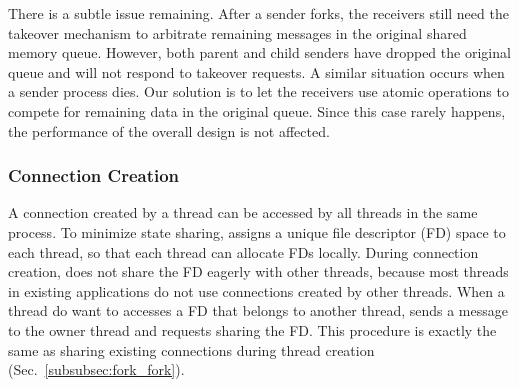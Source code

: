 There is a subtle issue remaining. After a sender forks, the receivers still need the takeover mechanism to arbitrate remaining messages in the original shared memory queue. However, both parent and child senders have dropped the original queue and will not respond to takeover requests. A similar situation occurs when a sender process dies. Our solution is to let the receivers use atomic operations to compete for remaining data in the original queue. Since this case rarely happens, the performance of the overall design is not affected.



\subsubsection{Connection Creation}
\label{subsubsec:fork_new}

A connection created by a thread can be accessed by all threads in the same process. To minimize state sharing, \libipc assigns a unique file descriptor (FD) space to each thread, so that each thread can allocate FDs locally. 
During connection creation, \libipc does not share the FD eagerly with other threads, because most threads in existing applications do not use connections created by other threads.
When a thread do want to accesses a FD that belongs to another thread, \libipc sends a message to the owner thread and requests sharing the FD. This procedure is exactly the same as sharing existing connections during thread creation (Sec.~\ref{subsubsec:fork_fork}). %

